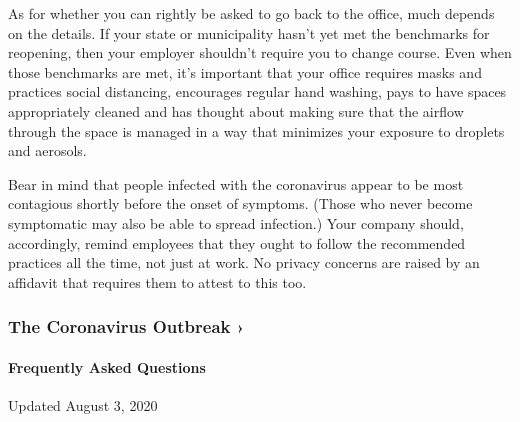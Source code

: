 As for whether you can rightly be asked to go back to the office, much
depends on the details. If your state or municipality hasn't yet met the
benchmarks for reopening, then your employer shouldn't require you to
change course. Even when those benchmarks are met, it's important that
your office requires masks and practices social distancing, encourages
regular hand washing, pays to have spaces appropriately cleaned and has
thought about making sure that the airflow through the space is managed
in a way that minimizes your exposure to droplets and aerosols.

Bear in mind that people infected with the coronavirus appear to be most
contagious shortly before the onset of symptoms. (Those who never become
symptomatic may also be able to spread infection.) Your company should,
accordingly, remind employees that they ought to follow the recommended
practices all the time, not just at work. No privacy concerns are raised
by an affidavit that requires them to attest to this too.

\href{https://www.nytimes3xbfgragh.onion/news-event/coronavirus?action=click\&pgtype=Article\&state=default\&region=MAIN_CONTENT_3\&context=storylines_faq}{}

\hypertarget{the-coronavirus-outbreak-}{%
\subsubsection{The Coronavirus Outbreak
›}\label{the-coronavirus-outbreak-}}

\hypertarget{frequently-asked-questions}{%
\paragraph{Frequently Asked
Questions}\label{frequently-asked-questions}}

Updated August 3, 2020

